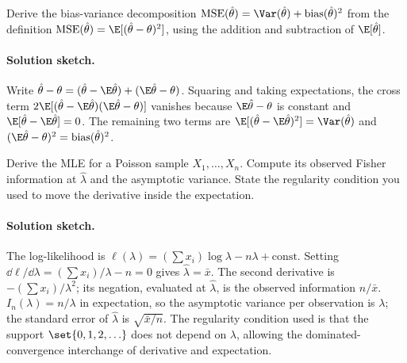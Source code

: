 \begin{exercise}
Derive the bias-variance decomposition $\operatorname{MSE}(\hat{\theta})
= \Var(\hat{\theta}) + \operatorname{bias}(\hat{\theta})^{2}$ from
the definition $\operatorname{MSE}(\hat{\theta}) = \E[(\hat{\theta}
- \theta)^{2}]$, using the addition and subtraction of
$\E[\hat{\theta}]$.

\paragraph{Solution sketch.} Write
$\hat{\theta} - \theta = (\hat{\theta} - \E\hat{\theta}) +
(\E\hat{\theta} - \theta)$. Squaring and taking expectations,
the cross term $2\E[(\hat{\theta} - \E\hat{\theta})(\E\hat{\theta} -
\theta)]$ vanishes because $\E\hat{\theta} - \theta$ is constant
and $\E[\hat{\theta} - \E\hat{\theta}] = 0$. The remaining two
terms are $\E[(\hat{\theta} - \E\hat{\theta})^{2}] =
\Var(\hat{\theta})$ and $(\E\hat{\theta} - \theta)^{2} =
\operatorname{bias}(\hat{\theta})^{2}$.
\end{exercise}

\begin{exercise}
Derive the MLE for a Poisson sample $X_{1}, \ldots, X_{n}$. Compute
its observed Fisher information at $\hat{\lambda}$ and the
asymptotic variance. State the regularity condition you used to
move the derivative inside the expectation.

\paragraph{Solution sketch.} The log-likelihood is
$\ell(\lambda) = (\sum x_{i})\log\lambda - n\lambda + \text{const}$.
Setting $\dd\ell/\dd\lambda = (\sum x_{i})/\lambda - n = 0$ gives
$\hat{\lambda} = \bar{x}$. The second derivative is
$-(\sum x_{i})/\lambda^{2}$; its negation, evaluated at
$\hat{\lambda}$, is the observed information $n/\bar{x}$.
$I_{n}(\lambda) = n/\lambda$ in expectation, so the asymptotic
variance per observation is $\lambda$; the standard error of
$\hat{\lambda}$ is $\sqrt{\bar{x}/n}$. The regularity condition
used is that the support $\set{0, 1, 2, \ldots}$ does not depend
on $\lambda$, allowing the dominated-convergence interchange of
derivative and expectation.
\end{exercise}

